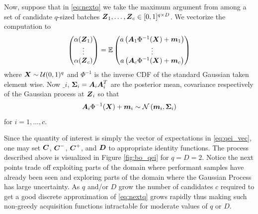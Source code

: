 \documentclass{article}[12pt]
\begin{document}
Now, suppose that in \eqref{eq:nextq} we take the maximum argument from among a set of candidate $q$-sized batches $\boldsymbol{Z}_1,\dots,\boldsymbol{Z}_c \in [0,1]^{q \times D}$. We vectorize the computation to 
\begin{equation}
    \begin{pmatrix} \alpha(\boldsymbol{Z}_1) \\ \vdots \\ \alpha(\boldsymbol{Z}_c)\end{pmatrix} = \mathbb{E}\begin{pmatrix}a\left(\boldsymbol{A}_1\Phi^{-1}(\boldsymbol{X})+\boldsymbol{m}_1\right) \\ \vdots \\ a\left(\boldsymbol{A}_c\Phi^{-1}(\boldsymbol{X})+\boldsymbol{m}_c\right)\end{pmatrix}
    \label{eq:qei_vec}
\end{equation}
where $\boldsymbol{X} \sim \mathcal{U}(0,1)^q$ and $\Phi^{-1}$ is the inverse CDF of the standard Gaussian taken element wise. Now $\bm_i$, $\boldsymbol{\Sigma}_i = \boldsymbol{A}_i\boldsymbol{A}_i^T$ are the posterior mean, covariance respectively of the Gaussian process at $\boldsymbol{Z}_i$ so that 
$$\boldsymbol{A}_i\Phi^{-1}(\boldsymbol{X})+\boldsymbol{m}_i \sim \mathcal{N}\left(\boldsymbol{m}_i,\boldsymbol{\Sigma}_i\right)$$
for $i=1,\dots,c$.

Since the quantity of interest is simply the vector of expectations in \eqref{eq:qei_vec}, one may set $\boldsymbol{C}$, $\boldsymbol{C}^-$, $\boldsymbol{C}^+$, and $\boldsymbol{D}$ to appropriate identity functions. The process described above is visualized in Figure \ref{fig:bo_qei} for $q=D=2$. Notice the next points trade off exploiting parts of the domain where performant samples have already been seen and  exploring parts of the domain where the Gaussian Process has large uncertainty.  As $q$ and/or $D$ grow the number of candidates $c$ required to get a good discrete approximation of \eqref{eq:nextq} grows rapidly thus making such non-greedy acquisition functions intractable for moderate values of $q$ or $D$.
\end{document}
